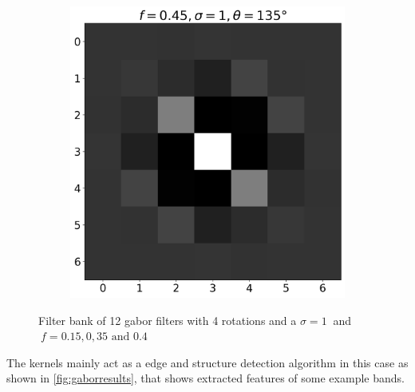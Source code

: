\documentclass[12pt,a4paper, english]{article}
\begin{document}
\begin{figure}[!htbp]
\begin{subfigure}[b]{0.3\textwidth}
      \end{subfigure}
      \begin{subfigure}[b]{0.3\textwidth}
        \includegraphics[width=\textwidth]{img/K11.png}
      \end{subfigure}
      \caption{Filter bank of 12 gabor filters with 4 rotations and a $\sigma=1\ $ and $\ f = 0.15, 0,35 \text{ and } 0.4$\label{fig:gaborbank}}%
    \end{figure}
%  
    \noindent
    The kernels mainly act as a edge and structure detection algorithm in this case as shown in \cref{fig:gaborresults}, that shows extracted features of some example bands.
\end{document}
